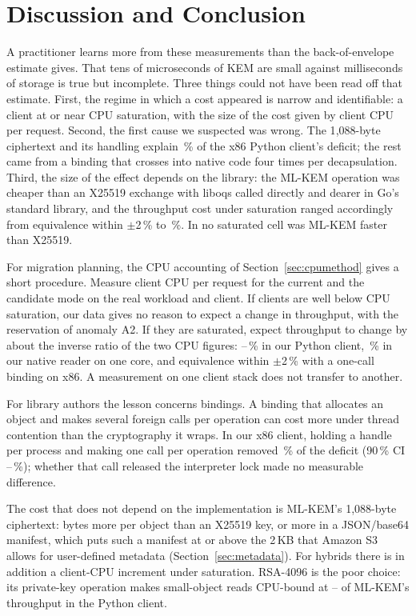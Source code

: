 \documentclass[conference]{IEEEtran}
\begin{document}
\section{Discussion and Conclusion}\label{sec:discussion}\label{sec:conclusion}
A practitioner learns more from these measurements than the back-of-envelope estimate gives. That tens of microseconds of KEM are
small against milliseconds of storage is true but incomplete. Three things could not have been
read off that estimate. First, the regime in which a cost appeared is narrow and identifiable:
a client at or near CPU saturation, with the size of the cost given by client CPU per request.
Second, the first cause we suspected was wrong. The 1{,}088-byte ciphertext and its handling
explain \AudPadShare\,\% of the x86 Python client's deficit; the rest came from a binding that
crosses into native code four times per decapsulation. Third, the size of the effect depends on
the library: the ML-KEM operation was cheaper than an X25519 exchange with liboqs called
directly and dearer in Go's standard library, and the throughput cost under saturation ranged
accordingly from equivalence within $\pm$2\,\% to \AudNOneMlkemDeficit\,\%. In no saturated cell
was ML-KEM faster than X25519.

For migration planning, the CPU accounting of Section~\ref{sec:cpumethod} gives a short
procedure. Measure client CPU per request for the current and the candidate mode on the real
workload and client. If clients are well below CPU saturation, our data gives no reason to
expect a change in throughput, with the reservation of anomaly A2. If they are saturated, expect
throughput to change by about the inverse ratio of the two CPU figures:
\RevHotDeficit--\ArmHotDeficit\,\% in our Python client, \AudNOneMlkemDeficit\,\% in our native
reader on one core, and equivalence within $\pm$2\,\% with a one-call binding on x86. A
measurement on one client stack does not transfer to another.

For library authors the lesson concerns bindings. A binding that allocates an object and makes several foreign calls
per operation can cost more under thread contention than the cryptography it wraps. In our x86
client, holding a handle per process and making one call per operation removed
\AudBindReleasedRemoved\,\% of the deficit (90\,\% CI
\AudBindReleasedRemovedLo--\AudBindReleasedRemovedHi\,\%); whether that call released the
interpreter lock made no measurable difference.

The cost that does not depend on the implementation is ML-KEM's
1{,}088-byte ciphertext: \RevMetaIntrinsic{} bytes more per object than an X25519 key, or
\RevMetaExtraMLKEM{} more in a JSON/base64 manifest, which puts such a manifest at or above the
2\,KB that Amazon S3 allows for user-defined metadata (Section~\ref{sec:metadata}). For hybrids
there is in addition a client-CPU increment under saturation. RSA-4096 is the poor choice: its
private-key operation makes small-object reads CPU-bound at \RevRsaGetLo--\RevRsaGetHi{} of
ML-KEM's throughput in the Python client.
\end{document}
